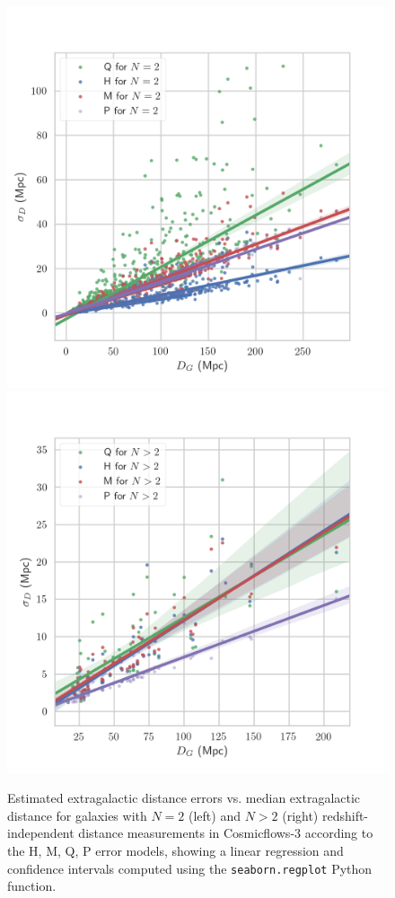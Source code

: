 \documentclass[a4paper,fleqn,usenatbib]{mnras}
\begin{document}
\begin{figure}
	\includegraphics[scale=0.69]{CF3low.png}
	\includegraphics[scale=0.69]{CF3high.png}
    \caption{Estimated extragalactic distance errors vs. median extragalactic distance for galaxies with $N=2$ (left) and $N>2$ (right) redshift-independent distance measurements in Cosmicflows-3 according to the H, M, Q, P error models, showing a linear regression and confidence intervals computed using the \texttt{seaborn.regplot} Python function.}
    \label{fig:CF3low}
\end{figure}
\end{document}

